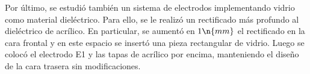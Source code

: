 Por último, se estudió también un sistema de electrodos implementando vidrio como material dieléctrico. Para ello, se le realizó un rectificado más profundo al dieléctrico de acrílico. En particular, se aumentó en $1 \n{mm}$ el rectificado en la cara frontal y en este espacio se insertó una pieza rectangular de vidrio. Luego se colocó el electrodo E1 y las tapas de acrílico por encima, manteniendo el diseño de la cara trasera sin modificaciones.